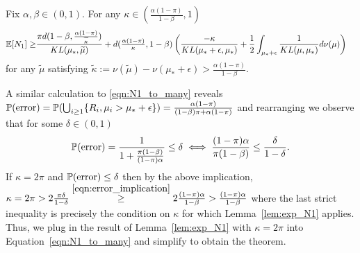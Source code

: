\begin{lemma}\label{lem:exp_N1}
Fix $\alpha,\beta \in (0,1)$. 
For any $\kappa \in (\frac{\alpha(1-\pi)}{1-\beta},1)$
\begin{align*}
\E[ N_1 ] \geq&  \frac{\pi  d(1-\beta,  \tfrac{\alpha(1-\pi)}{\widetilde{\kappa}})}{KL(\mu_*,\widetilde{\mu})} + d(\tfrac{\alpha(1-\pi)}{\kappa} , 1-\beta ) \left(  \frac{-\kappa}{KL(\mu_* + \epsilon, \mu_*)}  + \frac{1}{2} \int_{\mu_*+\epsilon} \frac{1}{KL(\mu,\mu_*)} d\nu(\mu) \right) 
\end{align*}
for any $\widetilde{\mu}$ satisfying $\widetilde{\kappa}:=\nu(\widetilde{\mu}) - \nu(\mu_*+\epsilon) > \frac{\alpha(1-\pi)}{1-\beta}$.
\end{lemma}
A similar calculation to \eqref{eqn:N1_to_many} reveals
$\P(\mathrm{error}) = \P( \bigcup_{i\geq 1} \{ R_i, \mu_i > \mu_* + \epsilon \} ) = \frac{ \alpha(1-\pi)}{(1-\beta)\pi + \alpha(1-\pi)}$ 
and rearranging we observe that for some $\delta \in (0,1)$
\begin{align} \label{eqn:error_implication}
\P(\mathrm{error}) 
= \frac{1}{1 + \frac{\pi(1-\beta)}{(1-\pi)\alpha}} \leq \delta \iff \frac{(1-\pi)\alpha}{\pi(1-\beta)} \leq \frac{\delta}{1-\delta}.
\end{align}
If $\kappa = 2 \pi$ and $\P(\mathrm{error})\leq \delta$ then by the above implication, 
$\kappa = 2\pi > 2 \tfrac{\pi \delta}{1-\delta} \overset{\eqref{eqn:error_implication}}{\geq} 2 \tfrac{(1-\pi)\alpha}{1-\beta} > \tfrac{(1-\pi)\alpha}{1-\beta}$
where the last strict inequality is precisely the condition on $\kappa$ for which Lemma~\ref{lem:exp_N1} applies.
Thus, we plug in the result of Lemma~\ref{lem:exp_N1} with $\kappa=2\pi$ into Equation~\ref{eqn:N1_to_many} and simplify to obtain the theorem.






